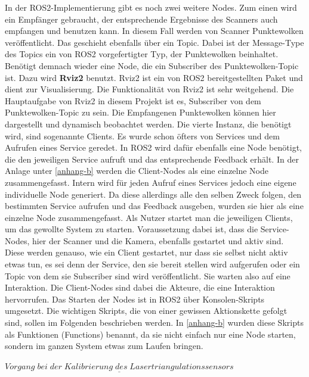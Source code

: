 		In der ROS2-Implementierung gibt es noch zwei weitere Nodes. Zum einen wird ein Empfänger gebraucht, der entsprechende Ergebnisse des Scanners auch empfangen und benutzen kann. In diesem Fall werden von Scanner Punktewolken veröffentlicht. Das geschieht ebenfalls über ein Topic. Dabei ist der Message-Type des Topics ein von ROS2 vorgefertigter Typ, der Punktewolken beinhaltet. Benötigt demnach wieder eine Node, die ein Subscriber des Punktewolken-Topic ist. Dazu wird \textbf{Rviz2} benutzt. Rviz2 ist ein von ROS2 bereitgestellten Paket und dient zur Visualisierung. Die Funktionalität von Rviz2 ist sehr weitgehend. Die Hauptaufgabe von Rviz2 in diesem Projekt ist es, Subscriber von dem Punktewolken-Topic zu sein. Die Empfangenen Punktewolken können hier dargestellt und dynamisch beobachtet werden. \newline
		Die vierte Instanz, die benötigt wird, sind sogenannte Clients. Es wurde schon öfters von Services und dem Aufrufen eines Service geredet. In ROS2 wird dafür ebenfalls eine Node benötigt, die den jeweiligen Service aufruft und das entsprechende Feedback erhält. In der Anlage unter \ref{anhang-b} werden die Client-Nodes als eine einzelne Node zusammengefasst. Intern wird für jeden Aufruf eines Services jedoch eine eigene individuelle Node generiert. Da diese allerdings alle den selben Zweck folgen, den bestimmten Service aufrufen und das Feedback ausgeben, wurden sie hier als eine einzelne Node zusammengefasst. Als Nutzer startet man die jeweiligen Clients, um das gewollte System zu starten. Voraussetzung dabei ist, dass die Service-Nodes, hier der Scanner und die Kamera, ebenfalls gestartet und aktiv sind. Diese werden genauso, wie ein Client gestartet, nur dass sie selbst nicht aktiv etwas tun, es sei denn der Service, den sie bereit stellen wird aufgerufen oder ein Topic von dem sie Subscriber sind wird veröffentlicht. Sie warten also auf eine Interaktion. Die Client-Nodes sind dabei die Akteure, die eine Interaktion hervorrufen. Das Starten der Nodes ist in ROS2 über Konsolen-Skripts umgesetzt. Die wichtigen Skripts, die von einer gewissen Aktionskette gefolgt sind, sollen im Folgenden beschrieben werden. In \ref{anhang-b} wurden diese Skripts als Funktionen (Functions) benannt, da sie nicht einfach nur eine Node starten, sondern im ganzen System etwas zum Laufen bringen.
		
		$\underline{Vorgang\;bei\;der\;Kalibrierung\;des\;Lasertriangulationssensors}$
		
